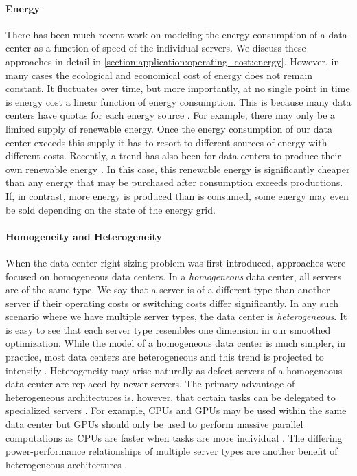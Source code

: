 \paragraph{Energy} There has been much recent work on modeling the energy consumption of a data center as a function of speed of the individual servers. We discuss these approaches in detail in \autoref{section:application:operating_cost:energy}. However, in many cases the ecological and economical cost of energy does not remain constant. It fluctuates over time, but more importantly, at no single point in time is energy cost a linear function of energy consumption. This is because many data centers have quotas for each energy source \cite{Miller2021}. For example, there may only be a limited supply of renewable energy. Once the energy consumption of our data center exceeds this supply it has to resort to different sources of energy with different costs. Recently, a trend has also been for data centers to produce their own renewable energy \cite{Lin2012}. In this case, this renewable energy is significantly cheaper than any energy that may be purchased after consumption exceeds productions. If, in contrast, more energy is produced than is consumed, some energy may even be sold depending on the state of the energy grid.

\paragraph{Homogeneity and Heterogeneity} When the data center right-sizing problem was first introduced, approaches were focused on homogeneous data centers. In a \textit{homogeneous} data center, all servers are of the same type. We say that a server is of a different type than another server if their operating costs or switching costs differ significantly. In any such scenario where we have multiple server types, the data center is \textit{heterogeneous}. It is easy to see that each server type resembles one dimension in our smoothed optimization. While the model of a homogeneous data center is much simpler, in practice, most data centers are heterogeneous and this trend is projected to intensify \cite{Jin2016}. Heterogeneity may arise naturally as defect servers of a homogeneous data center are replaced by newer servers. The primary advantage of heterogeneous architectures is, however, that certain tasks can be delegated to specialized servers \cite{Jin2016}. For example, CPUs and GPUs may be used within the same data center but GPUs should only be used to perform massive parallel computations as CPUs are faster when tasks are more individual \cite{Shan2006}. The differing power-performance relationships of multiple server types are another benefit of heterogeneous architectures \cite{Jin2016}.

